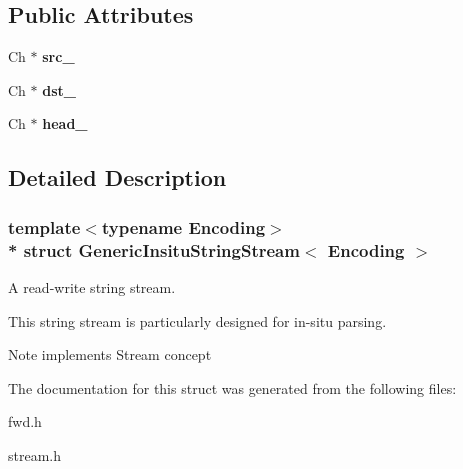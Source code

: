 \subsection*{Public Attributes}
\begin{DoxyCompactItemize}
\item 
Ch $\ast$ {\bfseries src\+\_\+}\hypertarget{a00116_af3cc551dd07fcca39db84459f4d4e718}{}\label{a00116_af3cc551dd07fcca39db84459f4d4e718}

\item 
Ch $\ast$ {\bfseries dst\+\_\+}\hypertarget{a00116_ab0e7a73638a7a8db81aa9b26714b0e3b}{}\label{a00116_ab0e7a73638a7a8db81aa9b26714b0e3b}

\item 
Ch $\ast$ {\bfseries head\+\_\+}\hypertarget{a00116_af5a7116bdd9bfde5141c298a5b7566b0}{}\label{a00116_af5a7116bdd9bfde5141c298a5b7566b0}

\end{DoxyCompactItemize}


\subsection{Detailed Description}
\subsubsection*{template$<$typename Encoding$>$\\*
struct Generic\+Insitu\+String\+Stream$<$ Encoding $>$}

A read-\/write string stream. 

This string stream is particularly designed for in-\/situ parsing. \begin{DoxyNote}{Note}
implements Stream concept 
\end{DoxyNote}


The documentation for this struct was generated from the following files\+:\begin{DoxyCompactItemize}
\item 
fwd.\+h\item 
stream.\+h\end{DoxyCompactItemize}
